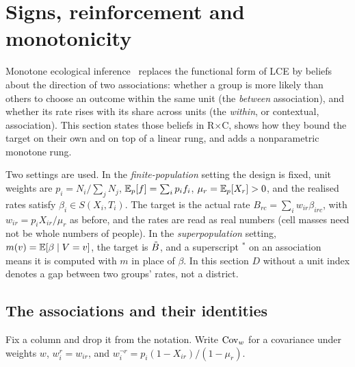 \section{Signs, reinforcement and monotonicity}\label{sec:signs}

Monotone ecological inference~\citep{egghm2025} replaces the functional form of
LCE by beliefs about the direction of two associations: whether a group is more
likely than others to choose an outcome within the same unit (the \emph{between}
association), and whether its rate rises with its share across units (the
\emph{within}, or contextual, association). This section states those beliefs in
R$\times$C, shows how they bound the target on their own and on top of a linear
rung, and adds a nonparametric monotone rung.

Two settings are used. In the \emph{finite-population} setting the design is
fixed, unit weights are $p_i=N_i/\sum_jN_j$, $\mathbb E_p[f]=\sum_ip_if_i$,
$\mu_r=\mathbb E_p[X_r]>0$, and the realised rates satisfy $\beta_i\in S(X_i,T_i)$. The
target is the actual rate $B_{rc}=\sum_iw_{ir}\beta_{irc}$, with
$w_{ir}=p_iX_{ir}/\mu_r$ as before, and the rates are read as real numbers (cell
masses need not be whole numbers of people). In the \emph{superpopulation}
setting, $m(v)=\mathbb E[\beta\mid V=v]$, the target is $\tilde B$, and a superscript $^*$ on
an association means it is computed with $m$ in place of $\beta$. In this section
$D$ without a unit index denotes a gap between two groups' rates, not a district.

\subsection{The associations and their identities}

Fix a column and drop it from the notation. Write $\operatorname{Cov}_w$ for a covariance under
weights $w$, $w^r_i=w_{ir}$, and $w^{\neg r}_i=p_i(1-X_{ir})/(1-\mu_r)$.

